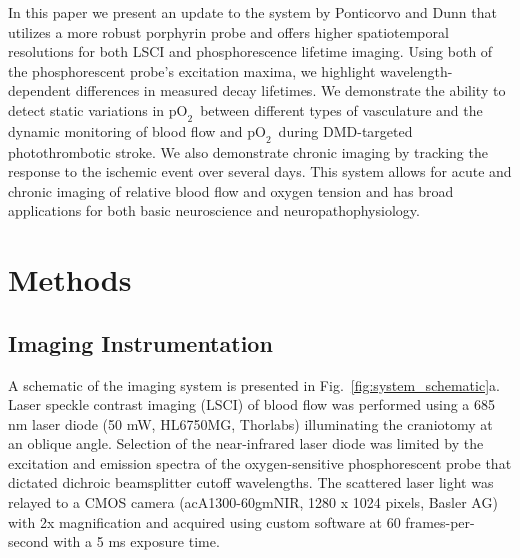 \documentclass[12pt]{spieman}  %
\newcommand{\pO}{\ensuremath{\text{pO}_2}} 	            %
\begin{document}
\begin{spacing}{2}
In this paper we present an update to the system by Ponticorvo and Dunn \cite{Ponticorvo:2010uv} that utilizes a more robust porphyrin probe \cite{Esipova:2011hi} and offers higher spatiotemporal resolutions for both LSCI and phosphorescence lifetime imaging. Using both of the phosphorescent probe's excitation maxima, we highlight wavelength-dependent differences in measured decay lifetimes. We demonstrate the ability to detect static variations in \pO\ between different types of vasculature and the dynamic monitoring of blood flow and \pO\ during DMD-targeted photothrombotic stroke. We also demonstrate chronic imaging by tracking the response to the ischemic event over several days. This system allows for acute and chronic imaging of relative blood flow and oxygen tension and has broad applications for both basic neuroscience and neuropathophysiology.


\section{Methods}
\label{sect:methods}

\subsection{Imaging Instrumentation}
A schematic of the imaging system is presented in Fig.~\ref{fig:system_schematic}a. Laser speckle contrast imaging (LSCI) of blood flow was performed using a 685 nm laser diode (50 mW, HL6750MG, Thorlabs) illuminating the craniotomy at an oblique angle. Selection of the near-infrared laser diode was limited by the excitation and emission spectra of the oxygen-sensitive phosphorescent probe that dictated dichroic beamsplitter cutoff wavelengths. The scattered laser light was relayed to a CMOS camera (acA1300-60gmNIR, 1280 x 1024 pixels, Basler AG) with 2x magnification and acquired using custom software at 60 frames-per-second with a 5 ms exposure time.


\end{spacing}
\end{document}
